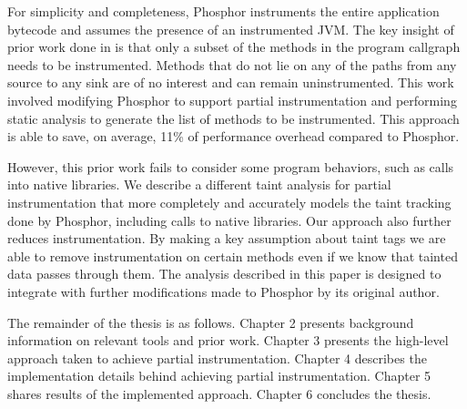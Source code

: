 For simplicity and completeness, Phosphor instruments the entire application bytecode and assumes the presence of an instrumented JVM. The key insight of prior work done in \cite{manoj_project} is that only a subset of the methods in the program callgraph needs to be instrumented. Methods that do not lie on any of the paths from any source to any sink are of no interest and can remain uninstrumented. This work involved modifying Phosphor to support partial instrumentation and performing static analysis to generate the list of methods to be instrumented. This approach is able to save, on average, 11\% of performance overhead compared to Phosphor. 

However, this prior work fails to consider some program behaviors, such as calls into native libraries. We describe a different taint analysis for partial instrumentation that more completely and accurately models the taint tracking done by Phosphor, including calls to native libraries. Our approach also further reduces instrumentation. By making a key assumption about taint tags we are able to remove instrumentation on certain methods even if we know that tainted data passes through them. The analysis described in this paper is designed to integrate with further modifications made to Phosphor by its original author.

The remainder of the thesis is as follows. Chapter 2 presents background information on relevant tools and prior work. Chapter 3 presents the high-level approach taken to achieve partial instrumentation. Chapter 4 describes the implementation details behind achieving partial instrumentation. Chapter 5 shares results of the implemented approach. Chapter 6 concludes the thesis.
